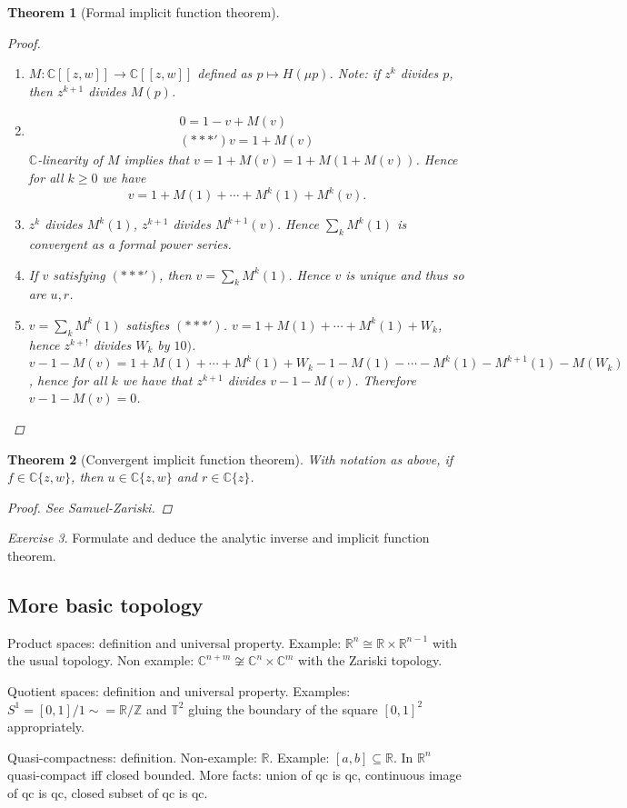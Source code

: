 \documentclass[11pt,A4]{article}
\theoremstyle{plain}
\newtheorem{thm}{Theorem}[section]
\theoremstyle{definition}
\theoremstyle{remark}
\newtheorem{exe}[thm]{Exercise}
\newcommand{\Z}{\mathbb{Z}}
\newcommand{\R}{\mathbb{R}}
\newcommand{\1}{\mathbbm{1}}
\newcommand{\C}{\mathbb{C}}
\begin{document}
\begin{thm}[Formal implicit function theorem]
\begin{proof}
\begin{enumerate}[label=\arabic*)]
\begin{multline*}
	    \end{multline*}
	\item $M\colon \C[[z,w]]\to \C[[z,w]]$ defined as $p\mapsto H(\mu p)$.
	    Note: if $z^{k}$ divides $p$, then $z^{k+1}$ divides $M(p)$.
	\item \begin{multline*}
		0=1-v+M(v) \\
		(***') v=1+M(v)
	    \end{multline*}
		$\C$-linearity of $M$ implies that $v=1+M(v)=1+M(1+M(v))$.
		Hence for all $k\geqslant 0$ we have
		\[ v=1+M(1)+\cdots +M^{k}(1)+M^{k}(v). \]
	\item $z^{k}$ divides $M^{k}(1)$, $z^{k+1}$ divides $M^{k+1}(v)$.
	    Hence $\sum_{k}M^{k}(1)$ is convergent as a formal power series.
	\item If $v$ satisfying $(***')$, then $v=\sum_{k}M^{k}(1)$.
	    Hence $v$ is unique and thus so are $u, r$.
	\item $v=\sum_{k}M^{k}(1)$ satisfies $(***')$.
	    $v=1+M(1)+\cdots +M^{k}(1)+W_{k}$, hence $z^{k+!}$ divides $W_{k}$ by $10)$.
		$v-1-M(v)=1+M(1)+\cdots +M^{k}(1)+W_{k}-1-M(1)-\cdots -M^{k}(1)-M^{k+1}(1)-M(W_{k})$, hence for all $k$ we have that $z^{k+1}$ divides $v-1-M(v)$.
		Therefore $v-1-M(v)=0$.
	\end{enumerate}
    \end{proof}
\end{thm}

\begin{thm}[Convergent implicit function theorem]
    With notation as above, if $f\in \C\{z,w\}$, then $u\in \C\{z,w\}$ and $r\in \C\{z\}$.
    \begin{proof}
	See Samuel-Zariski.
    \end{proof}
\end{thm}

\begin{exe}
    Formulate and deduce the analytic inverse and implicit function theorem.
\end{exe}

\subsection{More basic topology}

Product spaces: definition and universal property.
Example: $\R^{n}\cong \R\times \R^{n-1}$ with the usual topology.
Non example: $\C^{n+m}\not\cong \C^{n}\times \C^{m}$ with the Zariski topology.

Quotient spaces: definition and universal property.
Examples: $S^{1}=[0,1]/1\sim =\R/\Z$ and $\mathbb{T}^{2}$ gluing the boundary of the square $[0,1]^{2}$ appropriately.

Quasi-compactness: definition.
Non-example: $\R$.
Example: $[a,b]\subseteq \R$.
In $\R^{n}$ quasi-compact iff closed bounded.
More facts: union of qc is qc, continuous image of qc is qc, closed subset of qc is qc.



\end{document}
